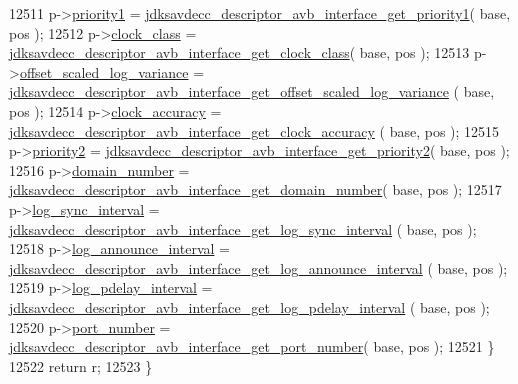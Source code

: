 \begin{DoxyCode}
12511         p->\hyperlink{structjdksavdecc__descriptor__avb__interface_af98f08e3d1b016cd549310197ba8673c}{priority1} = 
      \hyperlink{group__descriptor__avb__interface_ga582b25cdf077d01f72ae5140866ad6f3}{jdksavdecc\_descriptor\_avb\_interface\_get\_priority1}( base, 
      pos );
12512         p->\hyperlink{structjdksavdecc__descriptor__avb__interface_aafe98ca785cdce0ce5eaa26f2930d2fe}{clock\_class} = 
      \hyperlink{group__descriptor__avb__interface_ga406b7e597940341766ede84e9cee7822}{jdksavdecc\_descriptor\_avb\_interface\_get\_clock\_class}( 
      base, pos );
12513         p->\hyperlink{structjdksavdecc__descriptor__avb__interface_aa6a39c2a4a7071642573bb3b4e0a0a54}{offset\_scaled\_log\_variance} = 
      \hyperlink{group__descriptor__avb__interface_ga306ccea60de25ddc70c03ecece03ab8b}{jdksavdecc\_descriptor\_avb\_interface\_get\_offset\_scaled\_log\_variance}
      ( base, pos );
12514         p->\hyperlink{structjdksavdecc__descriptor__avb__interface_a708d6d971b6be997cf8d3e683951ceb0}{clock\_accuracy} = 
      \hyperlink{group__descriptor__avb__interface_ga039cb9a8f62227783caacf966490eda9}{jdksavdecc\_descriptor\_avb\_interface\_get\_clock\_accuracy}
      ( base, pos );
12515         p->\hyperlink{structjdksavdecc__descriptor__avb__interface_ac04b889463a96b43985cb82020e3c39b}{priority2} = 
      \hyperlink{group__descriptor__avb__interface_gabccc737f11d15cec6ccce06a85f83a74}{jdksavdecc\_descriptor\_avb\_interface\_get\_priority2}( base, 
      pos );
12516         p->\hyperlink{structjdksavdecc__descriptor__avb__interface_a96702548f5b9222af26319c695764b29}{domain\_number} = 
      \hyperlink{group__descriptor__avb__interface_ga2712c7c6fd90c32f1cb9be9585bec15f}{jdksavdecc\_descriptor\_avb\_interface\_get\_domain\_number}(
       base, pos );
12517         p->\hyperlink{structjdksavdecc__descriptor__avb__interface_a2d4950b4c6da4dfa67688dcaf6139c9d}{log\_sync\_interval} = 
      \hyperlink{group__descriptor__avb__interface_gadf748521fd5eb6ecf9ca00a7549f297f}{jdksavdecc\_descriptor\_avb\_interface\_get\_log\_sync\_interval}
      ( base, pos );
12518         p->\hyperlink{structjdksavdecc__descriptor__avb__interface_a15bb50a04ecd3ec11563012afc7e24a7}{log\_announce\_interval} = 
      \hyperlink{group__descriptor__avb__interface_ga780acbdef9be073b6a022925fd0db347}{jdksavdecc\_descriptor\_avb\_interface\_get\_log\_announce\_interval}
      ( base, pos );
12519         p->\hyperlink{structjdksavdecc__descriptor__avb__interface_a26544b553c0b251da8e632533f260a5d}{log\_pdelay\_interval} = 
      \hyperlink{group__descriptor__avb__interface_ga309e09dd5bcb1f5357e4fae31407236b}{jdksavdecc\_descriptor\_avb\_interface\_get\_log\_pdelay\_interval}
      ( base, pos );
12520         p->\hyperlink{structjdksavdecc__descriptor__avb__interface_af0afa7bb85d49ac5ff873fad86a48ec5}{port\_number} = 
      \hyperlink{group__descriptor__avb__interface_ga4dbce36958084f95019db490f154a3a6}{jdksavdecc\_descriptor\_avb\_interface\_get\_port\_number}( 
      base, pos );
12521     \}
12522     \textcolor{keywordflow}{return} r;
12523 \}
\end{DoxyCode}


